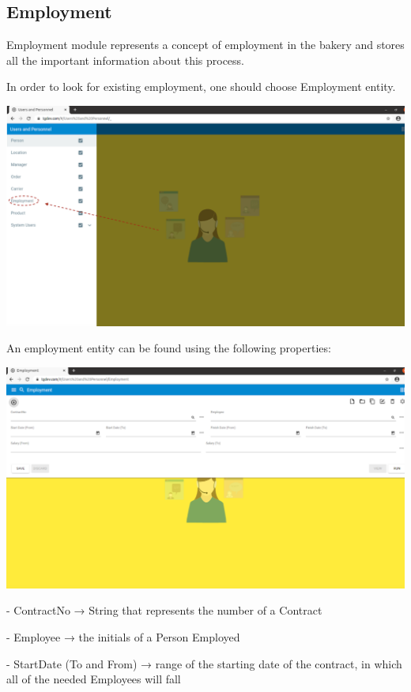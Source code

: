 \subsection{Employment}

Employment module represents a concept of employment in the bakery and stores all the important information about this process.

In order to look for existing employment, one should choose Employment entity.

\includegraphics[width=\textwidth]{sections/01-chapter/images/employment1.png}

An employment entity can be found using the following properties:

\includegraphics[width=\textwidth]{sections/01-chapter/images/employment2.png}

- ContractNo → String that represents the number of a Contract

- Employee → the initials of a Person Employed

- StartDate (To and From) → range of the starting date of the contract, in which all of the needed Employees will fall

